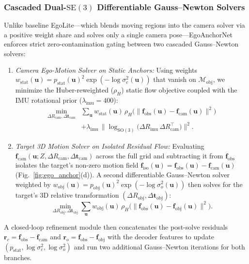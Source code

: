\documentclass[journal]{IEEEtran}
\begin{document}
\subsubsection{Cascaded Dual-$\mathrm{SE}(3)$ Differentiable Gauss--Newton Solvers}
Unlike baseline EgoLite---which blends moving regions into the camera solver via a positive weight share and solves only a single camera pose---EgoAnchorNet enforces strict zero-contamination gating between two cascaded Gauss--Newton solvers:
\begin{enumerate}
    \item \emph{Camera Ego-Motion Solver on Static Anchors:} Using weights $w_{\text{stat}}(\mathbf{u}) = p_{\text{stat}}(\mathbf{u})^2 \exp(-\log\sigma_c^2(\mathbf{u}))$ that vanish on $\mathcal{M}_{\text{obj}}$, we minimize the Huber-reweighted ($\rho_H$) static flow objective coupled with the IMU rotational prior ($\lambda_{\text{imu}} = 400$):
    \begin{align}
    \min_{\Delta R_{\text{cam}}, \Delta\mathbf{t}_{\text{cam}}} &\sum_{\mathbf{u}} w_{\text{stat}}(\mathbf{u})\,\rho_H\!\Big(\big\|\mathbf{f}_{\text{obs}}(\mathbf{u}) - \mathbf{f}_{\text{cam}}(\mathbf{u})\big\|^2\Big) \nonumber\\
    &+ \lambda_{\text{imu}}\,\big\|\log_{\mathrm{SO}(3)}\!\big(\Delta R_{\text{imu}}\,\Delta R_{\text{cam}}^\top\big)\big\|^2.
    \label{eq:solve_cam}
    \end{align}
    \item \emph{Target 3D Motion Solver on Isolated Residual Flow:} Evaluating $\mathbf{f}_{\text{cam}}(\mathbf{u}; Z, \Delta R_{\text{cam}}, \Delta\mathbf{t}_{\text{cam}})$ across the full grid and subtracting it from $\mathbf{f}_{\text{obs}}$ isolates the target's non-zero motion field $\mathbf{f}_{\text{iso}}(\mathbf{u}) = \mathbf{f}_{\text{obs}}(\mathbf{u}) - \mathbf{f}_{\text{cam}}(\mathbf{u})$ (Fig.~\ref{fig:ego_anchor}(d)). A second differentiable Gauss--Newton solver weighted by $w_{\text{obj}}(\mathbf{u}) = p_{\text{obj}}(\mathbf{u})^2 \exp(-\log\sigma_o^2(\mathbf{u}))$ then solves for the target's 3D relative transformation $(\Delta R_{\text{obj}}, \Delta\mathbf{t}_{\text{obj}})$:
    \begin{equation}
    \min_{\Delta R_{\text{obj}}, \Delta\mathbf{t}_{\text{obj}}} \sum_{\mathbf{u}} w_{\text{obj}}(\mathbf{u})\,\rho_H\!\Big(\big\|\mathbf{f}_{\text{obs}}(\mathbf{u}) - \mathbf{f}_{\text{obj}}(\mathbf{u})\big\|^2\Big).
    \label{eq:solve_obj}
    \end{equation}
\end{enumerate}
A closed-loop refinement module then concatenates the post-solve residuals $\mathbf{r}_c = \mathbf{f}_{\text{obs}} - \mathbf{f}_{\text{cam}}$ and $\mathbf{r}_o = \mathbf{f}_{\text{obs}} - \mathbf{f}_{\text{obj}}$ with the decoder features to update $(p_{\text{stat}}, \log\sigma_c^2, \log\sigma_o^2)$ and run two additional Gauss--Newton iterations for both branches.
\end{document}
